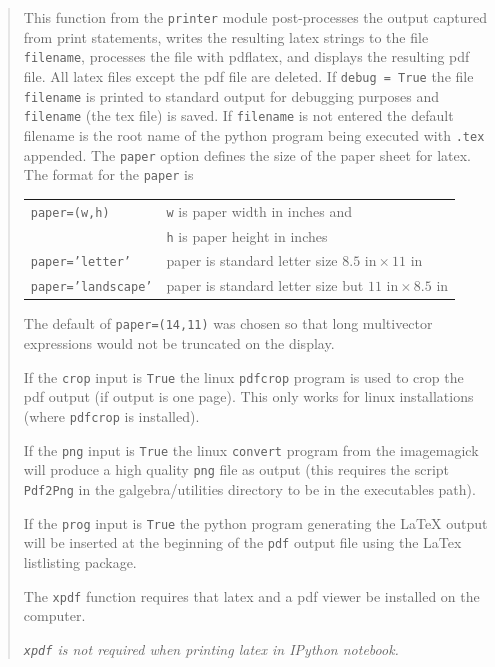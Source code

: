 \documentclass[12pt,twoside,openright]{memoir}
\newcommand{\T}[1]{\texttt{#1}}
\begin{document}
\begin{quote}
   This function from the \T{printer} module post-processes the output captured from
   print statements, writes the resulting latex strings to the file \T{filename},
   processes the file with pdflatex, and displays the resulting pdf file.   All latex files except
   the pdf file are deleted. If \T{debug = True} the file \T{filename} is printed to
   standard output for debugging purposes and \T{filename} (the tex file) is saved.  If \T{filename} is not entered the default
   filename is the root name of the python program being executed with \T{.tex} appended.
   The \T{paper} option defines the size of the paper sheet for latex. The format for the  \T{paper} is
   \begin{center}
   \begin{tabular}{ll}
       \T{paper=(w,h)} & \T{w} is paper width in inches and \\
                       & \T{h} is paper height in inches \\
       \T{paper='letter'} & paper is standard letter size $8.5\mbox{ in}\times 11\mbox{ in}$ \\
       \T{paper='landscape'} & paper is standard letter size but $11\mbox{ in}\times 8.5\mbox{ in}$
   \end{tabular}
   \end{center}
   The default of \T{paper=(14,11)} was chosen so that long multivector expressions would not be truncated on the display.
   
   If the \T{crop} input is \T{True} the linux \T{pdfcrop} program is used to crop the pdf output (if output is one page).  This only works
   for linux installations (where \T{pdfcrop} is installed).
   
   If the \T{png} input is \T{True} the linux \T{convert} program from the imagemagick will produce a high quality \T{png} file as
   output (this requires the script \T{Pdf2Png} in the galgebra/utilities directory to be in the executables path).
   
   If the \T{prog} input is \T{True} the python program generating the LaTeX output will be inserted at the beginning of the \T{pdf}
   output file using the LaTex listlisting package.
   
   The \T{xpdf} function requires that latex and a pdf viewer be installed on
   the computer.
   
   \emph{\T{xpdf} is not required when printing latex in IPython notebook.}
\end{quote}
\end{document}
